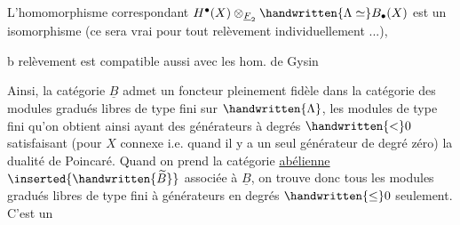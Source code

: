  L'homomorphisme correspondant $H^{\bullet}(X)\otimes_{\underline F_2}\handwritten{\Lambda\simeq} B_{\bullet}(X)$ est un isomorphisme (ce sera vrai pour tout relèvement individuellement ...), 

b\handwritten{)} \handwritten{[}  relèvement est compatible aussi avec les hom. de Gysin

Ainsi, la catégorie $\underline B$ admet un foncteur pleinement fidèle dans la catégorie des modules gradués libres de type fini sur $\handwritten{\Lambda}$, les modules de type fini qu'on obtient ainsi ayant des générateurs à degrés $\handwritten{<}0$  satisfaisant (pour $X$ connexe i.e. quand il y a un seul générateur de degré zéro) la dualité de Poincaré. Quand on prend la catégorie \uline{ abélienne} $\inserted{\handwritten{\widetilde B}}$ associée à $\underline B$, on trouve donc tous les modules gradués libres de type fini à générateurs  en degrés $\handwritten{\leq}0$ seulement. C'est un


